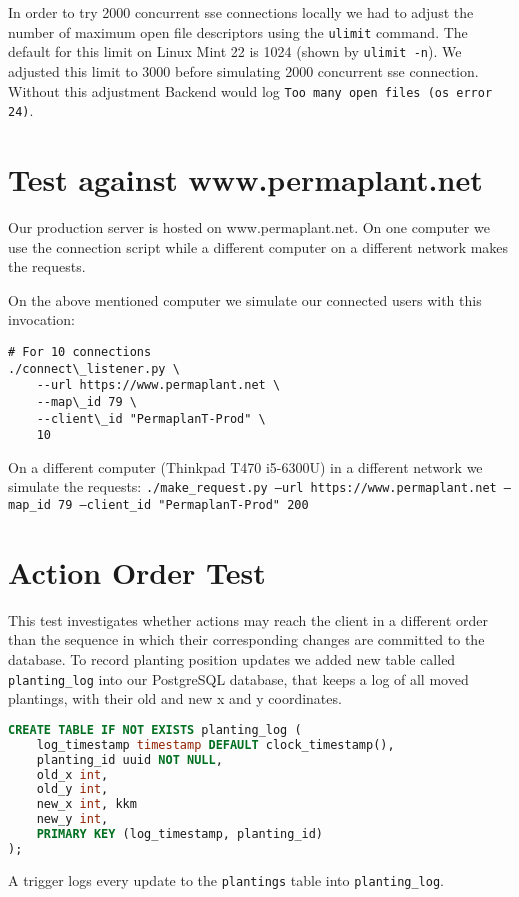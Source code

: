 \documentclass[final,draft,oneside]{vutinfth}
\begin{document}
In order to try 2000 concurrent \gls{sse} connections locally we had to adjust the number of maximum open file descriptors using the \texttt{ulimit} command.
The default for this limit on Linux Mint 22 is 1024 (shown by \texttt{ulimit -n}).
We adjusted this limit to 3000 before simulating 2000 concurrent \gls{sse} connection.
Without this adjustment Backend would log \texttt{Too many open files (os error 24)}.

\section{Test against www.permaplant.net}

Our production server is hosted on www.permaplant.net.
On one computer we use the connection script while a different computer on a different network makes the requests.

On the above mentioned computer we simulate our connected users with this invocation: 
\begin{verbatim}
# For 10 connections
./connect\_listener.py \
    --url https://www.permaplant.net \
    --map\_id 79 \
    --client\_id "PermaplanT-Prod" \
    10 
\end{verbatim}

On a different computer (Thinkpad T470 i5-6300U) in a different network we simulate the requests:
\texttt{./make\_request.py --url https://www.permaplant.net --map\_id 79 --client\_id "PermaplanT-Prod" 200}

\section{Action Order Test}

This test investigates whether actions may reach the client in a different order than the sequence in which their corresponding changes are committed to the database.
To record planting position updates we added new table called \texttt{planting\_log} into our PostgreSQL database, that keeps a log of all moved plantings, with their old and new x and y coordinates.

\begin{lstlisting}[language=sql]
CREATE TABLE IF NOT EXISTS planting_log (
    log_timestamp timestamp DEFAULT clock_timestamp(),
    planting_id uuid NOT NULL,
    old_x int,
    old_y int,
    new_x int, kkm
    new_y int,
    PRIMARY KEY (log_timestamp, planting_id)
);
\end{lstlisting}

A trigger logs every update to the \texttt{plantings} table into \texttt{planting\_log}.
\end{document}
